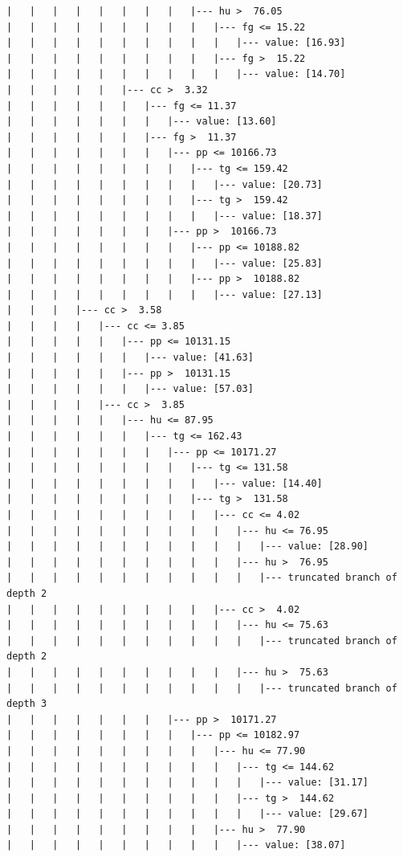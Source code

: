 \documentclass[UTF8, a4paper]{ctexart}
\begin{document}
\begin{lstlisting}
|   |   |   |   |   |   |   |   |--- hu >  76.05
|   |   |   |   |   |   |   |   |   |--- fg <= 15.22
|   |   |   |   |   |   |   |   |   |   |--- value: [16.93]
|   |   |   |   |   |   |   |   |   |--- fg >  15.22
|   |   |   |   |   |   |   |   |   |   |--- value: [14.70]
|   |   |   |   |   |--- cc >  3.32
|   |   |   |   |   |   |--- fg <= 11.37
|   |   |   |   |   |   |   |--- value: [13.60]
|   |   |   |   |   |   |--- fg >  11.37
|   |   |   |   |   |   |   |--- pp <= 10166.73
|   |   |   |   |   |   |   |   |--- tg <= 159.42
|   |   |   |   |   |   |   |   |   |--- value: [20.73]
|   |   |   |   |   |   |   |   |--- tg >  159.42
|   |   |   |   |   |   |   |   |   |--- value: [18.37]
|   |   |   |   |   |   |   |--- pp >  10166.73
|   |   |   |   |   |   |   |   |--- pp <= 10188.82
|   |   |   |   |   |   |   |   |   |--- value: [25.83]
|   |   |   |   |   |   |   |   |--- pp >  10188.82
|   |   |   |   |   |   |   |   |   |--- value: [27.13]
|   |   |   |--- cc >  3.58
|   |   |   |   |--- cc <= 3.85
|   |   |   |   |   |--- pp <= 10131.15
|   |   |   |   |   |   |--- value: [41.63]
|   |   |   |   |   |--- pp >  10131.15
|   |   |   |   |   |   |--- value: [57.03]
|   |   |   |   |--- cc >  3.85
|   |   |   |   |   |--- hu <= 87.95
|   |   |   |   |   |   |--- tg <= 162.43
|   |   |   |   |   |   |   |--- pp <= 10171.27
|   |   |   |   |   |   |   |   |--- tg <= 131.58
|   |   |   |   |   |   |   |   |   |--- value: [14.40]
|   |   |   |   |   |   |   |   |--- tg >  131.58
|   |   |   |   |   |   |   |   |   |--- cc <= 4.02
|   |   |   |   |   |   |   |   |   |   |--- hu <= 76.95
|   |   |   |   |   |   |   |   |   |   |   |--- value: [28.90]
|   |   |   |   |   |   |   |   |   |   |--- hu >  76.95
|   |   |   |   |   |   |   |   |   |   |   |--- truncated branch of depth 2
|   |   |   |   |   |   |   |   |   |--- cc >  4.02
|   |   |   |   |   |   |   |   |   |   |--- hu <= 75.63
|   |   |   |   |   |   |   |   |   |   |   |--- truncated branch of depth 2
|   |   |   |   |   |   |   |   |   |   |--- hu >  75.63
|   |   |   |   |   |   |   |   |   |   |   |--- truncated branch of depth 3
|   |   |   |   |   |   |   |--- pp >  10171.27
|   |   |   |   |   |   |   |   |--- pp <= 10182.97
|   |   |   |   |   |   |   |   |   |--- hu <= 77.90
|   |   |   |   |   |   |   |   |   |   |--- tg <= 144.62
|   |   |   |   |   |   |   |   |   |   |   |--- value: [31.17]
|   |   |   |   |   |   |   |   |   |   |--- tg >  144.62
|   |   |   |   |   |   |   |   |   |   |   |--- value: [29.67]
|   |   |   |   |   |   |   |   |   |--- hu >  77.90
|   |   |   |   |   |   |   |   |   |   |--- value: [38.07]

\end{lstlisting}
\end{document}
